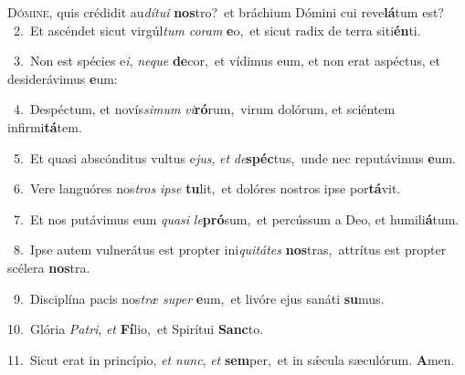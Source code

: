 \lettrine{\initial\textcolor{\initialcolor}{D}}{ómine,} quis crédidit au\-\textit{dí}\-\textit{tu}\textit{i} \textbf{nos}\-tro?~\star et bráchium Dómini cui reve\-\textbf{lá}\-tum est?\\
{\numbfont\textcolor{\numbcolor}{~2.}}~Et ascéndet sicut virgúl\textit{tum} \textit{co}\-\textit{ram} \textbf{e}\-o,~\star et sicut radix de terra siti\-\textbf{én}\-ti.\par
{\numbfont\textcolor{\numbcolor}{~3.}}~Non est spécies e\-\textit{i}\-, \textit{ne}\-\textit{que} \textbf{de}\-cor,~\star et vídimus eum, et non erat aspéctus, et desiderávimus \textbf{e}\-um:\par
{\numbfont\textcolor{\numbcolor}{~4.}}~Despéctum, et novís\-\textit{si}\-\textit{mum} \textit{vi}\-\textbf{ró}rum,~\star virum dolórum, et sciéntem infirmi\-\textbf{tá}\-tem.\par
{\numbfont\textcolor{\numbcolor}{~5.}}~Et quasi abscónditus vultus e\-\textit{jus}\-, \textit{et} \textit{de}\-\textbf{spéc}tus,~\star unde nec reputávimus \textbf{e}\-um.\par
{\numbfont\textcolor{\numbcolor}{~6.}}~Vere languóres nos\textit{tros} \textit{ip}\-\textit{se} \textbf{tu}\-lit,~\star et dolóres nostros ipse por\-\textbf{tá}\-vit.\par
{\numbfont\textcolor{\numbcolor}{~7.}}~Et nos putávimus eum \textit{qua}\-\textit{si} \textit{le}\-\textbf{pró}sum,~\star et percússum a Deo, et humili\-\textbf{á}\-tum.\par
{\numbfont\textcolor{\numbcolor}{~8.}}~Ipse autem vulnerátus est propter ini\-\textit{qui}\-\textit{tá}\textit{tes} \textbf{nos}\-tras,~\star attrítus est propter scélera \textbf{nos}\-tra.\par
{\numbfont\textcolor{\numbcolor}{~9.}}~Disciplína pacis nos\textit{træ} \textit{su}\-\textit{per} \textbf{e}\-um,~\star et livóre ejus sanáti \textbf{su}\-mus.\par
{\numbfont\textcolor{\numbcolor}{10.}}~Glória \textit{Pa}\-\textit{tri}, \textit{et} \textbf{Fí}\-lio,~\star et Spirítui \textbf{Sanc}\-to.\par
{\numbfont\textcolor{\numbcolor}{11.}}~Sicut erat in princípio, \textit{et} \textit{nunc}\-, \textit{et} \textbf{sem}\-per,~\star et in sǽcula sæculórum. \textbf{A}\-men.\par
